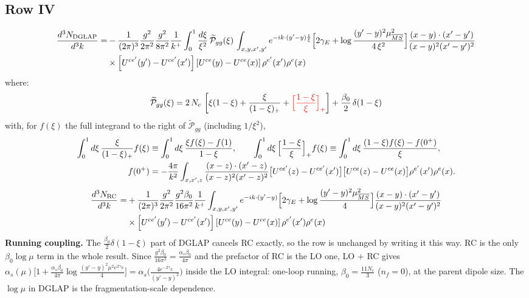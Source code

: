 \documentclass[9pt]{article}
\numberwithin{equation}{section}
\begin{document}
\subsection{Row IV}
\begin{align}
\frac{d^{3}N_{\rm DGLAP}}{d^{3}k}= &-\frac{1}{(2\pi)^{3}}\frac{g^{2}}{2\pi^{2}}\frac{g^{2}}{8\pi^{2}}\frac{1}{k^{+}}\int_{0}^{1}\frac{d\xi}{\xi^{2}}\,\widetilde{\mathcal P}_{gg}(\xi)\,\int_{x,y,x',y'}e^{-ik\cdot(y'-y)\frac{1}{\xi}}\Big[2\gamma_{E}+\log\frac{(y'-y)^{2}\mu^{2}_{\overline{MS}}}{4\,\xi^{2}}\Big]\frac{(x-y)\cdot(x'-y')}{(x-y)^{2}(x'-y')^{2}}\notag\\
&\times\left[U^{ce'}(y') - U^{ce'}(x')\right]\left[U^{ce}(y) - U^{ce}(x)\right]\rho^{e'}(x')\rho^{e}(x)
\end{align}
where:
$$\widetilde{\mathcal{P}}_{gg}(\xi) = 2\,N_{c}\,\left[\xi(1-\xi) + \frac{\xi}{(1-\xi)_{+}} + {\color{red}\Big[\frac{1-\xi}{\xi}\Big]_{+}}\right]+\frac{\beta_{0}}{2}\,\delta(1-\xi) $$
{\color{red}with, for $f(\xi)$ the full integrand to the right of $\widetilde{\mathcal P}_{gg}$ (including $1/\xi^{2}$),
\begin{align}
\int_{0}^{1}d\xi\,\frac{\xi}{(1-\xi)_{+}}f(\xi)&\equiv\int_{0}^{1}d\xi\,\frac{\xi f(\xi)-f(1)}{1-\xi},\qquad
\int_{0}^{1}d\xi\,\Big[\frac{1-\xi}{\xi}\Big]_{+}f(\xi)\equiv\int_{0}^{1}d\xi\,\frac{(1-\xi)f(\xi)-f(0^{+})}{\xi},\notag\\
f(0^{+})&=-\frac{4\pi}{k^{2}}\int_{x,x',z}\frac{(x-z)\cdot(x'-z)}{(x-z)^{2}(x'-z)^{2}}\big[U^{ce'}(z)-U^{ce'}(x')\big]\big[U^{ce}(z)-U^{ce}(x)\big]\rho^{e'}(x')\rho^{e}(x).\notag
\end{align}}
\begin{align}
\frac{d^{3}N_{\rm RC}}{d^{3}k}= & +\frac{1}{(2\pi)^{3}}\frac{g^{2}}{2\pi^{2}}\frac{g^{2}\beta_{0}}{16\pi^{2}}\frac{1}{k^{+}}\int_{x,y,x',y'}e^{-ik\cdot(y'-y)}\Big[2\gamma_{E}+\log\frac{(y'-y)^{2}\mu^{2}_{\overline{MS}}}{4}\Big]\frac{(x-y)\cdot(x'-y')}{(x-y)^{2}(x'-y')^{2}}\notag\\
&\times\left[U^{ce'}(y') - U^{ce'}(x')\right]\left[U^{ce}(y) - U^{ce}(x)\right]\rho^{e'}(x')\rho^{e}(x)
\end{align}
{\color{red}\textbf{Running coupling.} The $\frac{\beta_{0}}{2}\delta(1-\xi)$ part of DGLAP cancels RC exactly, so the row is unchanged by writing it this way. RC is the only $\beta_{0}\log\mu$ term in the whole result. Since $\frac{g^{2}\beta_{0}}{16\pi^{2}}=\frac{\alpha_{s}\beta_{0}}{4\pi}$ and the prefactor of RC is the LO one, LO $+$ RC gives
$\alpha_{s}(\mu)\big[1+\frac{\alpha_{s}\beta_{0}}{4\pi}\log\frac{(y'-y)^{2}\mu^{2}e^{2\gamma_{E}}}{4}\big]=\alpha_{s}\big(\frac{4e^{-2\gamma_{E}}}{(y'-y)^{2}}\big)$ inside the LO integral: one-loop running, $\beta_{0}=\frac{11N_{c}}{3}$ ($n_{f}=0$), at the parent dipole size. The $\log\mu$ in DGLAP is the fragmentation-scale dependence.}
\end{document}
